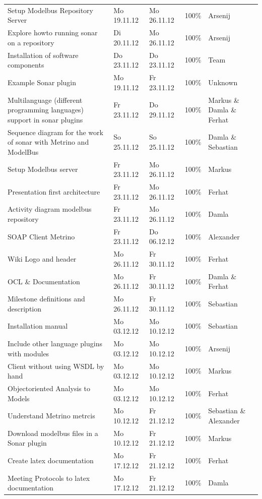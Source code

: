 \begin{longtable}{|p{6cm}|p{2.5cm}|p{2.5cm}|p{1.7cm}|p{1.8cm}|}
Setup Modelbus Repository Server & Mo 19.11.12 & Mo 26.11.12 & 100\% & Arsenij \\ 
Explore howto running sonar on a repository & Di 20.11.12 & Mo 26.11.12 & 100\% & Arsenij \\ 
Installation of software components & Do 23.11.12 & Do 23.11.12 & 100\% & Team \\ 
Example Sonar plugin & Mo 19.11.12 & Fr 23.11.12 & 100\%     & Unknown                 \\ 
Multilanguage (different programming languages) support in sonar plugins & Fr 23.11.12 & Do 29.11.12 & 100\%     & Markus  \&  Damla  \&  Ferhat \\
Sequence diagram for the work of sonar with Metrino and ModelBus & So 25.11.12 & So 25.11.12 & 100\%     & Damla \& Sebastian \\ 
Setup Modelbus server & Fr 23.11.12 & Mo 26.11.12 & 100\%& Markus \\ 
Presentation first architecture & Fr 23.11.12 & Mo 26.11.12 & 100\% & Ferhat \\ 
Activity diagram modelbus repository & Fr 23.11.12 & Mo 26.11.12 & 100\% & Damla \\ 
SOAP Client Metrino & Fr 23.11.12 & Do 06.12.12 & 100\% & Alexander \\ 
Wiki Logo and header & Mo 26.11.12 & Fr 30.11.12 & 100\% & Ferhat \\ 
OCL  \&  Documentation & Mo 26.11.12 & Fr 30.11.12 & 100\% & Damla \&  Ferhat \\ 
Milestone definitions and description & Mo 26.11.12 & Fr 30.11.12 & 100\% & Sebastian \\ 
Installation manual & Mo 03.12.12 & Mo 10.12.12 & 100\% & Sebastian \\ 
Include other language plugins with modules & Mo 03.12.12 & Mo 10.12.12 & 100\% & Arsenij \\
Client without using WSDL by hand & Mo 03.12.12 & Mo 10.12.12 & 100\% & Markus \\ 
Objectoriented Analysis to Models & Mo 03.12.12 & Mo 10.12.12 & 100\% & Ferhat \\ 
Understand Metrino metrcis & Mo 10.12.12 & Fr 21.12.12 & 100\% & Sebastian  \&  Alexander \\ 
Download modelbus files in a Sonar plugin & Mo 10.12.12 & Fr 21.12.12 & 100\% & Markus \\ 
Create latex documentation & Mo 17.12.12 & Fr 21.12.12 & 100\% & Ferhat \\ 
Meeting Protocols to latex documentation & Mo 17.12.12 & Fr 21.12.12 & 100\% & Damla \\ 

\end{longtable}
